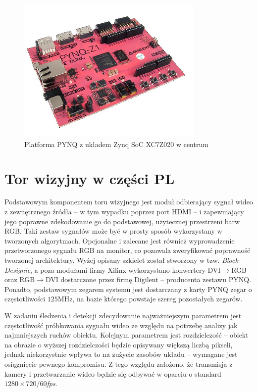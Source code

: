 \begin{figure}[h]
	\centering
	\includegraphics[width=9cm]{4_PYNQ.jpg}
	\caption{Platforma PYNQ z układem Zynq SoC XC7Z020 w centrum}
	\label{fig:PYNQ}
\end{figure}


\section{Tor wizyjny w części PL} 
\label{sec:counter}


Podstawowym komponentem toru wizyjnego jest moduł odbierający sygnał wideo z zewnętrznego źródła -- w tym wypadku poprzez port HDMI -- i zapewniający jego poprawne zdekodowanie go do podstawowej, użytecznej przestrzeni barw RGB. 
Taki zestaw sygnałów może być w prosty sposób wykorzystany w tworzonych algorytmach. 
Opcjonalne i zalecane jest również wyprowadzenie przetworzonego sygnału RGB na monitor, co pozawala zweryfikować poprawność tworzonej architektury. 
Wyżej opisany szkielet został stworzony w tzw. \textit{Block Designie}, a poza modułami firmy Xilinx wykorzystano konwertery DVI$\rightarrow$RGB oraz RGB$\rightarrow$DVI dostarczone przez firmę Digilent -- producenta zestawu PYNQ. 
Ponadto, podstawowym zegarem systemu jest dostarczany z karty PYNQ zegar o częstotliwości $125$MHz, na bazie którego powstaje szereg pozostałych zegarów. 
 
W zadaniu śledzenia i detekcji zdecydowanie najważniejszym parametrem jest częstotliwość próbkowania sygnału wideo ze względu na potrzebę analizy jak najmniejszych ruchów obiektu. 
Kolejnym parametrem jest rozdzielczość -- obiekt na obrazie o wyższej rozdzielczości będzie opisywany większą liczbą pikseli, jednak niekorzystnie wpływa to na zużycie zasobów układu -- wymagane jest osiągnięcie pewnego kompromisu. 
Z tego względu założono, że transmisja z kamery i przetwarzanie wideo będzie się odbywać w oparciu o standard $1280\times 720/60$\textit{fps}.

